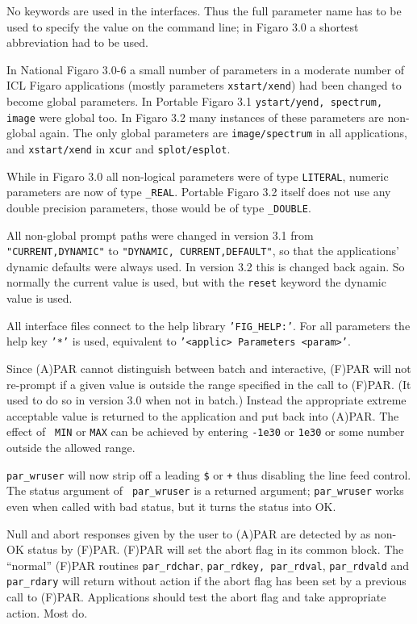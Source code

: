 No keywords are used in
the interfaces.  Thus the full parameter name has to be used to specify
the value on the command line; in Figaro 3.0 a shortest abbreviation had
to be used.

In National Figaro 3.0-6 a small number of parameters in a moderate
number of ICL Figaro applications (mostly parameters {\tt xstart/xend}) had
been changed to become global parameters. In Portable Figaro 3.1
{\tt ystart/yend, spectrum, image} were global too.  In Figaro 3.2 many
instances of these parameters are non-global again.  The only global
parameters are {\tt image/spectrum}
in all applications, and {\tt xstart/xend} in {\tt xcur} and
{\tt splot/esplot}.

While in Figaro 3.0 all non-logical parameters were of type {\tt LITERAL},
numeric parameters are now of type {\tt \_REAL}. Portable Figaro 3.2 itself
does not use any double precision parameters, those would be of type
{\tt \_DOUBLE}.

All non-global prompt paths were changed in version 3.1 from
{\tt "CURRENT,DYNAMIC"} to {\tt "DYNAMIC, CURRENT,DEFAULT"},
so that the applications'
dynamic defaults were always used.  In version 3.2 this is changed back
again.  So normally the current value is used, but with the {\tt reset}
keyword the dynamic value is used.

All interface files connect to the help library {\tt 'FIG\_HELP:'}. For all
parameters the help key {\tt '*'} is used, equivalent to {\tt '<applic>
Parameters <param>'}.

Since (A)PAR cannot distinguish between batch and interactive,
(F)PAR will not re-prompt if a given value is outside the range
specified in the call to (F)PAR. (It used to do so in version 3.0 when
not in batch.) Instead the appropriate extreme acceptable value is
returned to the application and put back into (A)PAR. The effect of {\tt
MIN} or {\tt MAX} can be achieved by entering {\tt -1e30} or {\tt 1e30}
or some number outside the allowed range.

{\tt par\_wruser} will now strip off a leading {\tt \$} or {\tt +} thus
disabling the line feed control. The status argument of {\tt
par\_wruser} is a returned argument; {\tt par\_wruser} works even when
called with bad status, but it turns the status into OK.

Null and abort responses given by the user to (A)PAR are detected by as
non-OK status by (F)PAR. (F)PAR will set the abort flag in its common
block. The ``normal'' (F)PAR routines {\tt par\_rdchar}, {\tt par\_rdkey,
par\_rdval}, {\tt par\_rdvald} and {\tt par\_rdary} will return without
action if the abort flag has been set by a previous call to (F)PAR.
Applications should test the abort flag and take appropriate action.
Most do.

